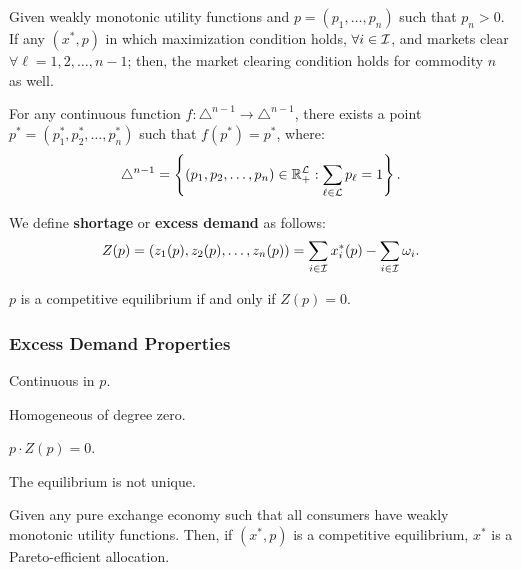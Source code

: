\documentclass[8pt,a4paper]{extarticle}
\begin{document}
\begin{multicols}{3}
  \begin{boxcor}
    Given weakly monotonic utility functions and $p = (p_1, \ldots, p_n)$ such that $p_n > 0$. If any $(x^*, p)$ in which maximization condition holds, $\forall i \in \mathcal{I}$, and markets clear $\forall \ell = 1, 2, \ldots, n - 1$; then, the market clearing condition holds for commodity $n$ as well.
  \end{boxcor}

  \begin{boxtheo}
    For any continuous function $f : \triangle^{n - 1} \to \triangle^{n - 1}$, there exists a point $p^* = (p^*_1, p^*_2, \ldots, p^*_n)$ such that $f(p^*) = p^*$, where: $$\displaystyle \triangle^{n - 1} = \left\{(p_1, p_2, \ldots, p_n) \in \mathbb{R}_+^{\mathcal{L}} : \sum_{\ell \in \mathcal{L}} p_\ell = 1 \right\}.$$
  \end{boxtheo}

  \begin{boxdef}[Shortage]
    We define \textbf{shortage} or \textbf{excess demand} as follows:
    \[
      Z(p) = (z_1(p), z_2(p), \ldots, z_n(p)) = \sum_{i \in \mathcal{I}} x^*_i(p) - \sum_{i \in \mathcal{I}} \omega_i
      .\]
  \end{boxdef}

  \begin{boxprop}
    $p$ is a competitive equilibrium if and only if $Z(p) = 0$.
  \end{boxprop}

  \sectionbreak

  \subsubsection*{Excess Demand Properties}

  \begin{eqlist}
    \item Continuous in $p$.
    \item Homogeneous of degree zero.
    \item $p \cdot Z(p) = 0$.
  \end{eqlist}

  \begin{boxprop}
    The equilibrium is not unique.
  \end{boxprop}

  \begin{boxtheo}[Welfare I]
    Given any pure exchange economy such that all consumers have weakly monotonic utility functions. Then, if $(x^*, p)$ is a competitive equilibrium, $x^*$ is a Pareto-efficient allocation.
  \end{boxtheo}


\end{multicols}
\end{document}
